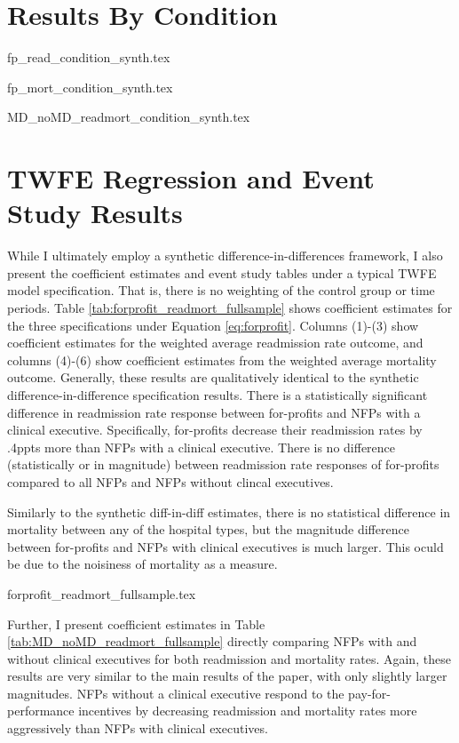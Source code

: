 \documentclass[12pt]{article}
\begin{document}
\section{Results By Condition}

{fp_read_condition_synth.tex}

{fp_mort_condition_synth.tex}

{MD_noMD_readmort_condition_synth.tex}

\section{TWFE Regression and Event Study Results}\label{app:fullsample}

While I ultimately employ a synthetic difference-in-differences framework, I also present the coefficient estimates and event study tables under a typical TWFE model specification. That is, there is no weighting of the control group or time periods. Table \ref{tab:forprofit_readmort_fullsample} shows coefficient estimates for the three specifications under Equation \ref{eq:forprofit}. Columns (1)-(3) show coefficient estimates for the weighted average readmission rate outcome, and columns (4)-(6) show coefficient estimates from the weighted average mortality outcome. Generally, these results are qualitatively identical to the synthetic difference-in-difference specification results. There is a statistically significant difference in readmission rate response between for-profits and NFPs with a clinical executive. Specifically, for-profits decrease their readmission rates by .4ppts more than NFPs with a clinical executive. There is no difference (statistically or in magnitude) between readmission rate responses of for-profits compared to all NFPs and NFPs without clincal executives. 

Similarly to the synthetic diff-in-diff estimates, there is no statistical difference in mortality between any of the hospital types, but the magnitude difference between for-profits and NFPs with clinical executives is much larger. This oculd be due to the noisiness of mortality as a measure. 

{forprofit_readmort_fullsample.tex}

Further, I present coefficient estimates in Table \ref{tab:MD_noMD_readmort_fullsample} directly comparing NFPs with and without clinical executives for both readmission and mortality rates. Again, these results are very similar to the main results of the paper, with only slightly larger magnitudes. NFPs without a clinical executive respond to the pay-for-performance incentives by decreasing readmission and mortality rates more aggressively than NFPs with clinical executives. 
\end{document}

